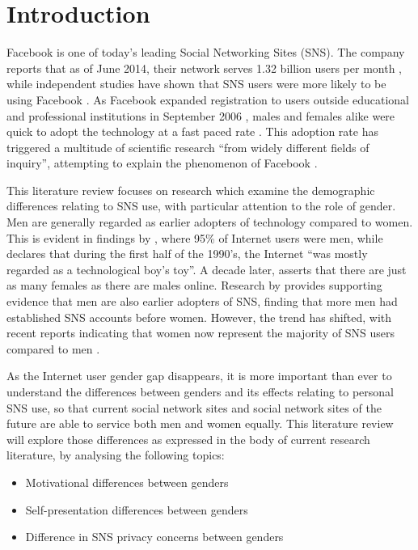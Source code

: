 \section{Introduction}

Facebook is one of today's leading Social Networking Sites (SNS). The company reports that as of June 2014, their network serves 1.32 billion users per month \citep{Facebook2014}, while independent studies have shown that SNS users were more likely to be using Facebook \citep{Hampton2011, Raacke2008, Hargittai2007}. As Facebook expanded registration to users outside educational and professional institutions in September 2006 \citep{Facebook2014}, males and females alike were quick to adopt the technology at a fast paced rate \citep{Mazman2011}. This adoption rate has triggered a multitude of scientific research ``from widely different fields of inquiry'', attempting to explain the phenomenon of Facebook \citep[p. 983]{Caers2013}. 

This literature review focuses on research which examine the demographic differences relating to SNS use, with particular attention to the role of gender. Men are generally regarded as earlier adopters of technology compared to women. This is evident in findings by \citet{Pitkow1994}, where 95\% of Internet users were men, while \citet[p. 896]{Kimbrough2013} declares that during the first half of the 1990's, the Internet ``was mostly regarded as a technological boy's toy''. A decade later, \citet{Fallows2005} asserts that there are just as many females as there are males online. Research by \citet{Fogel2009} provides supporting evidence that men are also earlier adopters of SNS, finding that more men had established SNS accounts before women. However, the trend has shifted, with recent reports indicating that women now represent the majority of SNS users compared to men \citep{Duggan2013, Hampton2011}.

As the Internet user gender gap disappears, it is more important than ever to understand the differences between genders and its effects relating to personal SNS use, so that current social network sites and social network sites of the future are able to service both men and women equally. This literature review will explore those differences as expressed in the body of current research literature, by analysing the following topics:
\begin{itemize}
\item Motivational differences between genders
\item Self-presentation differences between genders
\item Difference in SNS privacy concerns between genders
\end{itemize}